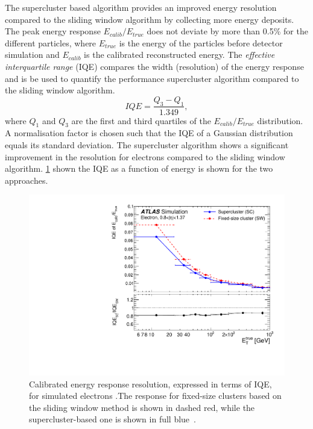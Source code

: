 The supercluster based algorithm provides an improved energy resolution compared to the sliding window algorithm by collecting more energy deposits. The peak energy response $E_{calib}/E_{true}$ does not deviate by more than 0.5\% for the different particles, where $E_{true}$ is the energy of the particles before detector simulation and $E_{calib}$ is the calibrated reconstructed energy. The \emph{effective interquartile range} (IQE) compares the width (resolution) of the energy response and is be used to quantify the performance supercluster algorithm compared to the sliding window algorithm. 
\begin{equation}
    IQE = \frac{Q_3 - Q_1}{1.349},
\end{equation}
where $Q_1$ and $Q_3$ are the first and third quartiles of the $E_{calib}/E_{true}$ distribution. A normalisation factor is chosen such that the IQE of a Gaussian distribution equals its standard deviation. The supercluster algorithm shows a significant improvement in the resolution for electrons compared to the sliding window algorithm. \cref{fig:method:iqe} shown the IQE as a function of energy is shown for the two approaches. 
\begin{figure}[h]
    \centering
    \includegraphics[width=\mediumfigwidth]{images/IQE_reco_1.pdf}
    \caption[Calibrated energy response resolution, expressed in terms of IQE, for simulated electrons]{Calibrated energy response resolution, expressed in terms of IQE, for simulated electrons .The response for fixed-size clusters based on the sliding window method is shown in dashed red, while the supercluster-based one is shown in full blue~\cite{Aad:2019tso}.}
    \label{fig:method:iqe}
\end{figure}

